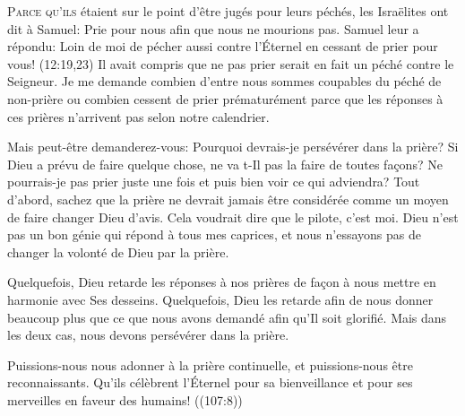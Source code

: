 \dvrule







\lettrine{P}{arce qu'ils} étaient sur le point d'être jugés pour leurs péchés,
 les Israëlites ont dit à Samuel: 
 \Og Prie pour nous afin que nous ne mourions pas. \Fg{} 
 Samuel leur a répondu: 
 \Og Loin de moi de pécher aussi contre l'Éternel en cessant de prier
 pour vous! \Fg{}
 (12:19,23)
 Il avait compris que ne pas prier serait en fait un péché contre le Seigneur.
 Je me demande combien d'entre nous sommes coupables du péché de
 \Og non-prière \Fg{} ou combien cessent de prier prématurément
 parce que les réponses à ces prières n'arrivent pas
 selon notre calendrier.


Mais peut-être demanderez-vous: 
 \Og Pourquoi devrais-je persévérer dans la prière?
 Si Dieu a prévu de faire quelque chose, ne va t-Il pas la faire
 de toutes fa\c{c}ons? Ne pourrais-je pas prier juste une fois et puis bien voir
 ce qui adviendra? \Fg{}
 Tout d'abord, sachez que la prière ne devrait jamais être considérée
 comme un moyen de faire changer Dieu d'avis.
 Cela voudrait dire que le pilote, c'est moi.
 Dieu n'est pas un bon génie qui répond à tous mes caprices,
 et nous n'essayons pas de changer la volonté de Dieu par la prière.

Quelquefois, Dieu retarde les réponses à nos prières de fa\c{c}on à nous mettre
 en harmonie avec Ses desseins. Quelquefois, Dieu les retarde afin de nous
 donner beaucoup plus que ce que nous avons demandé afin qu'Il soit glorifié.
 Mais dans les deux cas, nous devons persévérer dans la prière.

Puissions-nous nous adonner à la prière continuelle, et puissions-nous
 être reconnaissants.
 \Og Qu'ils célèbrent l'Éternel pour sa bienveillance et pour ses merveilles
 en faveur des humains! \Fg{} ((107:8))


